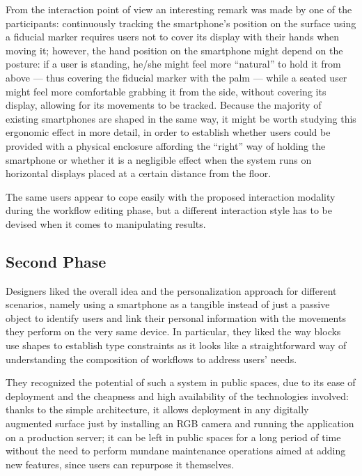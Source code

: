 From the interaction point of view an interesting remark was made by one of the participants: continuously tracking the smartphone's position on the surface using a fiducial marker requires users not to cover its display with their hands when moving it; however, the hand position on the smartphone might depend on the posture: if a user is standing, he/she might feel more ``natural'' to hold it from above --- thus covering the fiducial marker with the palm --- while a seated user might feel more comfortable grabbing it from the side, without covering its display, allowing for its movements to be tracked. Because the majority of existing smartphones are shaped in the same way, it might be worth studying this ergonomic effect in more detail, in order to establish whether users could be provided with a physical enclosure affording the ``right'' way of holding the smartphone or whether it is a negligible effect when the system runs on horizontal displays placed at a certain distance from the floor.

The same users appear to cope easily with the proposed interaction modality during the workflow editing phase, but a different interaction style has to be devised when it comes to manipulating results.

\subsection{Second Phase}
Designers liked the overall idea and the personalization approach for different scenarios, namely using a smartphone as a tangible instead of just a passive object to identify users and link their personal information with the movements they perform on the very same device. In particular, they liked the way blocks use shapes to establish type constraints as it looks like a straightforward way of understanding the composition of workflows to address users' needs.

They recognized the potential of such a system in public spaces, due to its ease of deployment and the cheapness and high availability of the technologies involved: thanks to the simple architecture, it allows deployment in any digitally augmented surface just by installing an RGB camera and running the application on a production server; it can be left in public spaces for a long period of time without the need to perform mundane maintenance operations aimed at adding new features, since users can repurpose it themselves.

